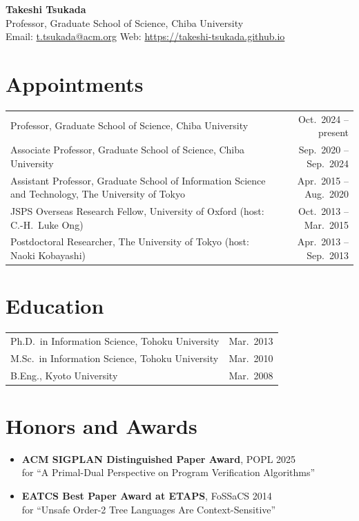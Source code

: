 \documentclass[10pt,a4paper]{article}
\begin{document}
\begin{center}
{\LARGE\bfseries Takeshi Tsukada}\\[3pt]
Professor, Graduate School of Science, Chiba University\\[2pt]
Email: \href{mailto:t.tsukada@acm.org}{t.tsukada@acm.org}
\quad\textbar\quad
Web: \href{https://takeshi-tsukada.github.io}{https://takeshi-tsukada.github.io}
\end{center}

\section*{Appointments}
\begin{tabularx}{\textwidth}{@{}XR@{}}
Professor, Graduate School of Science, Chiba University & Oct.\ 2024 -- present \\
Associate Professor, Graduate School of Science, Chiba University & Sep.\ 2020 -- Sep.\ 2024 \\
Assistant Professor, Graduate School of Information Science and Technology, The University of Tokyo & Apr.\ 2015 -- Aug.\ 2020 \\
JSPS Overseas Research Fellow, University of Oxford (host: C.-H.\ Luke Ong) & Oct.\ 2013 -- Mar.\ 2015 \\
Postdoctoral Researcher, The University of Tokyo (host: Naoki Kobayashi) & Apr.\ 2013 -- Sep.\ 2013 \\
\end{tabularx}

\section*{Education}
\begin{tabularx}{\textwidth}{@{}XR@{}}
Ph.D.\ in Information Science, Tohoku University & Mar.\ 2013 \\
M.Sc.\ in Information Science, Tohoku University & Mar.\ 2010 \\
B.Eng., Kyoto University & Mar.\ 2008 \\
\end{tabularx}

\section*{Honors and Awards}
\begin{itemize}
  \item \textbf{ACM SIGPLAN Distinguished Paper Award}, POPL 2025 \\
        for ``A Primal-Dual Perspective on Program Verification Algorithms''
  \item \textbf{EATCS Best Paper Award at ETAPS}, FoSSaCS 2014 \\
        for ``Unsafe Order-2 Tree Languages Are Context-Sensitive''
\end{itemize}
\end{document}
